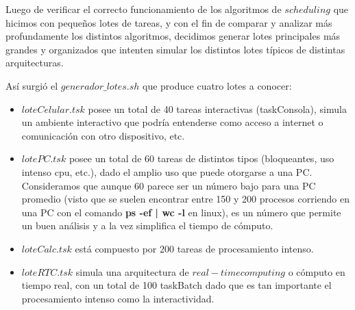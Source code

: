 Luego de verificar el correcto funcionamiento de los algoritmos de $scheduling$ que hicimos con peque\~nos lotes de tareas, y con el fin de comparar y analizar m\'as profundamente los distintos algoritmos, decidimos generar lotes principales m\'as grandes y organizados que intenten simular los distintos lotes t\'ipicos de distintas arquitecturas.

As\'i surgi\'o el $generador\_lotes.sh$ que produce cuatro lotes a conocer:

\begin{itemize}
	\item $loteCelular.tsk$ posee un total de 40 tareas interactivas (taskConsola), simula un ambiente interactivo que podr\'ia entenderse como acceso a internet o comunicaci\'on con otro dispositivo, etc.
	\item $lotePC.tsk$ posee un total de 60 tareas de distintos tipos (bloqueantes, uso intenso cpu, etc.), dado el amplio uso que puede otorgarse a una PC. Consideramos que aunque 60 parece ser un n\'umero bajo para una PC promedio (visto que se suelen encontrar entre 150 y 200 procesos corriendo en una PC con el comando \textbf{ps -ef | wc -l} en linux), es un n\'umero que permite un buen an\'alisis y a la vez simplifica el tiempo de c\'omputo.
	\item $loteCalc.tsk$ est\'a compuesto por 200 tareas de procesamiento intenso.
	\item $loteRTC.tsk$ simula una arquitectura de $real-time computing$ o c\'omputo en tiempo real, con un total de 100 taskBatch dado que es tan importante el procesamiento intenso como la interactividad.
\end{itemize}


